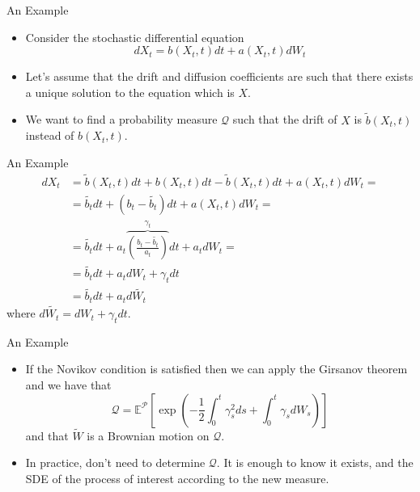 \documentclass{beamer}
\begin{document}
\begin{frame}{An Example}
\begin{itemize}
	\item Consider the stochastic differential equation
	\begin{equation*}
	dX_t = b(X_t, t) dt + a(X_t, t) dW_t
	\end{equation*}
	\item Let's assume that the drift and diffusion coefficients are such that there exists a unique solution to the equation which is $X$.
	\item We want to find a probability measure $\mathcal{Q}$ such that the drift of $X$ is $\tilde{b}(X_t,t)$ instead of $b(X_t,t)$.
\end{itemize}
\end{frame}

\begin{frame}{An Example}
	\begin{equation*}
	\begin{aligned}
		dX_t &= \tilde{b}(X_t,t) dt+b(X_t,t) dt -\tilde{b}(X_t,t) dt + a(X_t,t) dW_t = \\
        &=\tilde{b_t} dt + (b_t -\tilde{b_t})dt + a(X_t,t) dW_t =\\
		&=\tilde{b_t}dt+ a_t\overbrace{\left(\frac{b_t-\tilde{b_t}}{a_t}\right)}^{\gamma_t}dt + a_t dW_t = \\
        &= \tilde{b_t}dt+a_t dW_t + \gamma_t dt\\
		&=\tilde{b_t}dt+a_t d\tilde{W_t}
		\end{aligned}
		\end{equation*}
		where $d\tilde{W_t}=dW_t+\gamma_t dt$.
\end{frame}

\begin{frame}{An Example}
\begin{itemize}
	\item If the Novikov condition is satisfied then we can apply the Girsanov theorem and we have that
	\begin{equation}
		\mathcal{Q} = \mathbb{E}^\mathcal{P}\left[\exp\left(-\frac{1}{2}\int_0^t \gamma_s^2 ds + \int_0^t \gamma_s dW_s \right)\right]
	\end{equation}
	and that $\tilde{W}$ is a Brownian motion on $\mathcal{Q}$.
	\item In practice, don't need to determine $\mathcal{Q}$. It is enough to know it exists, and the SDE of the process of interest according to the new measure.	
	\end{itemize}
\end{frame}
\end{document}
